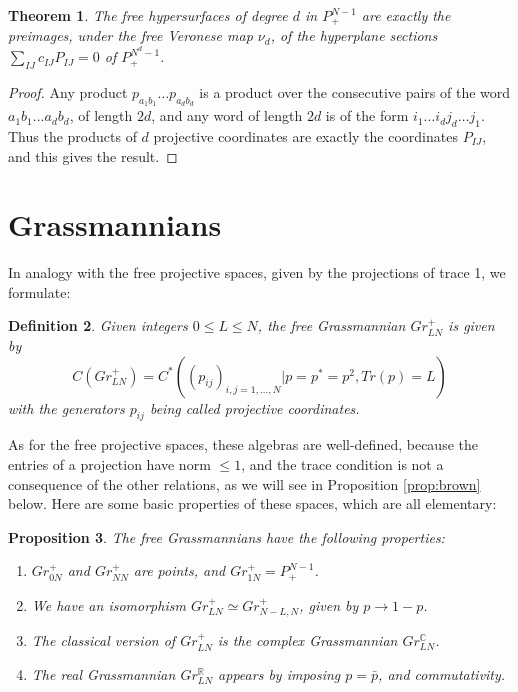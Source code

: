 \documentclass[11pt]{article}
\theoremstyle{plain}
\newtheorem{theorem}{Theorem}[section]
\newtheorem{proposition}[theorem]{Proposition}
\newtheorem{definition}[theorem]{Definition}
\begin{document}
\begin{theorem}
\label{thm:hyper}
The free hypersurfaces of degree $d$ in $P^{N-1}_+$ are exactly the preimages, under the free Veronese map $\nu_d$, of the hyperplane sections $\sum_{IJ}c_{IJ}P_{IJ}=0$ of $P^{N^d-1}_+$.
\end{theorem}

\begin{proof}
Any product $p_{a_1b_1}\ldots p_{a_db_d}$ is a product over the consecutive pairs of the word $a_1b_1\ldots a_db_d$, of length $2d$, and any word of length $2d$ is of the form $i_1\ldots i_dj_d\ldots j_1$. Thus the products of $d$ projective coordinates are exactly the coordinates $P_{IJ}$, and this gives the result.
\end{proof}

\section{Grassmannians}

In analogy with the free projective spaces, given by the projections of trace 1, we formulate:

\begin{definition}
Given integers $0\leq L\leq N$, the free Grassmannian $Gr^+_{LN}$ is given by
$$C(Gr^+_{LN})=C^*\left((p_{ij})_{i,j=1,\ldots,N}\Big|p=p^*=p^2,Tr(p)=L\right)$$
with the generators $p_{ij}$ being called projective coordinates.
\end{definition}

As for the free projective spaces, these algebras are well-defined, because the entries of a projection have norm $\leq1$, and the trace condition is not a consequence of the other relations, as we will see in Proposition \ref{prop:brown} below. Here are some basic properties of these spaces, which are all elementary:

\begin{proposition}
The free Grassmannians have the following properties:
\begin{enumerate}
\item $Gr^+_{0N}$ and $Gr^+_{NN}$ are points, and $Gr^+_{1N}=P^{N-1}_+$.

\item We have an isomorphism $Gr^+_{LN}\simeq Gr^+_{N-L,N}$, given by $p\to1-p$.

\item The classical version of $Gr^+_{LN}$ is the complex Grassmannian $Gr^\mathbb C_{LN}$.

\item The real Grassmannian $Gr^\mathbb R_{LN}$ appears by imposing $p=\bar{p}$, and commutativity.
\end{enumerate}
\end{proposition}
\end{document}
